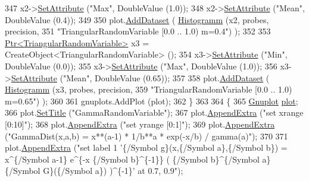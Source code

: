\begin{DoxyCode}
347     x2->\hyperlink{classns3_1_1ObjectBase_ac60245d3ea4123bbc9b1d391f1f6592f}{SetAttribute} (\textcolor{stringliteral}{"Max"}, DoubleValue (1.0));
348     x2->\hyperlink{classns3_1_1ObjectBase_ac60245d3ea4123bbc9b1d391f1f6592f}{SetAttribute} (\textcolor{stringliteral}{"Mean"}, DoubleValue (0.4));
349 
350     plot.\hyperlink{classns3_1_1Gnuplot_a306ec724a327cf9ab699700f31fca0a1}{AddDataset} ( \hyperlink{main-random-variable-stream_8cc_a2cfd3837ab3f2e816cf53486d7a186b5}{Histogramm} (x2, probes, precision,
351                                   \textcolor{stringliteral}{"TriangularRandomVariable [0.0 .. 1.0) m=0.4"}) );
352 
353     \hyperlink{classns3_1_1Ptr}{Ptr<TriangularRandomVariable>} x3 = CreateObject<TriangularRandomVariable> 
      ();
354     x3->\hyperlink{classns3_1_1ObjectBase_ac60245d3ea4123bbc9b1d391f1f6592f}{SetAttribute} (\textcolor{stringliteral}{"Min"}, DoubleValue (0.0));
355     x3->\hyperlink{classns3_1_1ObjectBase_ac60245d3ea4123bbc9b1d391f1f6592f}{SetAttribute} (\textcolor{stringliteral}{"Max"}, DoubleValue (1.0));
356     x3->\hyperlink{classns3_1_1ObjectBase_ac60245d3ea4123bbc9b1d391f1f6592f}{SetAttribute} (\textcolor{stringliteral}{"Mean"}, DoubleValue (0.65));
357 
358     plot.\hyperlink{classns3_1_1Gnuplot_a306ec724a327cf9ab699700f31fca0a1}{AddDataset} ( \hyperlink{main-random-variable-stream_8cc_a2cfd3837ab3f2e816cf53486d7a186b5}{Histogramm} (x3, probes, precision,
359                                   \textcolor{stringliteral}{"TriangularRandomVariable [0.0 .. 1.0) m=0.65"}) );
360 
361     gnuplots.AddPlot (plot);
362   \}
363 
364   \{
365     \hyperlink{classns3_1_1Gnuplot}{Gnuplot} \hyperlink{lte__amc_8m_a5942306abe9f005572e4344e3cdef528}{plot};
366     plot.\hyperlink{classns3_1_1Gnuplot_ac01f15633d49f0239f8a45293a1e04f0}{SetTitle} (\textcolor{stringliteral}{"GammaRandomVariable"});
367     plot.\hyperlink{classns3_1_1Gnuplot_a649a3041b9d0ea21a212b5ad9b28ecbf}{AppendExtra} (\textcolor{stringliteral}{"set xrange [0:10]"});
368     plot.\hyperlink{classns3_1_1Gnuplot_a649a3041b9d0ea21a212b5ad9b28ecbf}{AppendExtra} (\textcolor{stringliteral}{"set yrange [0:1]"});
369     plot.\hyperlink{classns3_1_1Gnuplot_a649a3041b9d0ea21a212b5ad9b28ecbf}{AppendExtra} (\textcolor{stringliteral}{"GammaDist(x,a,b) = x**(a-1) * 1/b**a * exp(-x/b) / gamma(a)"});
370 
371     plot.\hyperlink{classns3_1_1Gnuplot_a649a3041b9d0ea21a212b5ad9b28ecbf}{AppendExtra} (\textcolor{stringliteral}{"set label 1 '\{/Symbol g\}(x,\{/Symbol a\},\{/Symbol b\}) = x^\{/Symbol a-1\}
       e^\{-x \{/Symbol b\}^\{-1\}\} ( \{/Symbol b\}^\{/Symbol a\} \{/Symbol G\}(\{/Symbol a\}) )^\{-1\}' at 0.7, 0.9"});

\end{DoxyCode}
